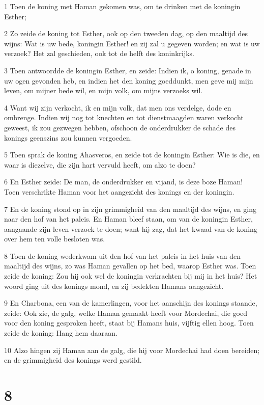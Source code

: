 \par 1 Toen de koning met Haman gekomen was, om te drinken met de koningin Esther;
\par 2 Zo zeide de koning tot Esther, ook op den tweeden dag, op den maaltijd des wijns: Wat is uw bede, koningin Esther! en zij zal u gegeven worden; en wat is uw verzoek? Het zal geschieden, ook tot de helft des koninkrijks.
\par 3 Toen antwoordde de koningin Esther, en zeide: Indien ik, o koning, genade in uw ogen gevonden heb, en indien het den koning goeddunkt, men geve mij mijn leven, om mijner bede wil, en mijn volk, om mijns verzoeks wil.
\par 4 Want wij zijn verkocht, ik en mijn volk, dat men ons verdelge, dode en ombrenge. Indien wij nog tot knechten en tot dienstmaagden waren verkocht geweest, ik zou gezwegen hebben, ofschoon de onderdrukker de schade des konings geenszins zou kunnen vergoeden.
\par 5 Toen sprak de koning Ahasveros, en zeide tot de koningin Esther: Wie is die, en waar is diezelve, die zijn hart vervuld heeft, om alzo te doen?
\par 6 En Esther zeide: De man, de onderdrukker en vijand, is deze boze Haman! Toen verschrikte Haman voor het aangezicht des konings en der koningin.
\par 7 En de koning stond op in zijn grimmigheid van den maaltijd des wijns, en ging naar den hof van het paleis. En Haman bleef staan, om van de koningin Esther, aangaande zijn leven verzoek te doen; want hij zag, dat het kwaad van de koning over hem ten volle besloten was.
\par 8 Toen de koning wederkwam uit den hof van het paleis in het huis van den maaltijd des wijns, zo was Haman gevallen op het bed, waarop Esther was. Toen zeide de koning: Zou hij ook wel de koningin verkrachten bij mij in het huis? Het woord ging uit des konings mond, en zij bedekten Hamans aangezicht.
\par 9 En Charbona, een van de kamerlingen, voor het aanschijn des konings staande, zeide: Ook zie, de galg, welke Haman gemaakt heeft voor Mordechai, die goed voor den koning gesproken heeft, staat bij Hamans huis, vijftig ellen hoog. Toen zeide de koning: Hang hem daaraan.
\par 10 Alzo hingen zij Haman aan de galg, die hij voor Mordechai had doen bereiden; en de grimmigheid des konings werd gestild.

\chapter{8}

